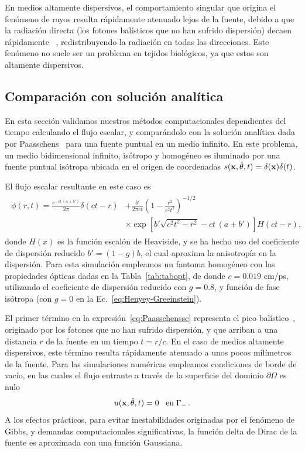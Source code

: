 En medios altamente dispersivos, el comportamiento singular 
que origina el fenómeno de rayos resulta rápidamente atenuado lejos 
de la fuente, debido a que la radiación directa 
(los fotones balísticos que no han sufrido dispersión) decaen rápidamente
~\cite{Ramankutty1997}, redistribuyendo la radiación en todas las 
direcciones. Este fenómeno no suele ser un problema en tejidos biológicos, 
ya que estos son altamente dispersivos.

\subsection{Comparación con solución analítica}

En esta sección validamos nuestros métodos computacionales 
dependientes del tiempo calculando el flujo escalar, 
y comparándolo con la solución analítica dada por Paasschens~\cite{Paasschens1997} 
para una fuente puntual en un medio infinito. 
En este problema, un medio bidimensional infinito, 
isótropo y homogéneo es iluminado por una fuente puntual isótropa
ubicada en el origen de coordenadas $s(\mathbf{x},\hat{\theta},t)=\delta(\mathbf{x})\delta(t)$.

El flujo escalar resultante en este caso es 
\begin{equation}
\begin{split}
\begin{aligned}
\phi(r,t)=\frac{e^{-c t \, (a+b')}}{2\pi}\delta(ct-r)&+\frac{b'}{2\pi c t}\left(1-\frac{r^2}{c^2t^2}\right)^{-1/2}\\
&\times\exp\left[b'\sqrt{c^2t^2-r^2}-c t \, (a+b')\right]H(ct-r),
\end{aligned}
\end{split}
\label{eq:Paasschenssc}
\end{equation}
donde $H(x)$ es la función escalón de Heaviside, 
y se ha hecho uso del coeficiente de dispersión reducido $b'=(1-g)b$, 
el cual aproxima la anisotropía en la dispersión.
Para esta simulación empleamos un fantoma homogéneo con las propiedades ópticas 
dadas en la Tabla~\ref{tab:tabopt}, de donde $c=0.019$ cm/ps, 
utilizando el coeficiente de dispersión reducido con $g=0.8$, y función de fase isótropa (con $g=0$ en la Ec.~\eqref{eq:Henyey-Greeinstein}). 


El primer término en la expresión~\eqref{eq:Paasschenssc} 
representa el pico balístico~\cite{Paasschens1997}, originado 
por los fotones que no han sufrido dispersión, y que arriban a una distancia $r$
 de la fuente en un tiempo $t=r/c$.
En el caso de medios altamente dispersivos, este término resulta rápidamente atenuado 
a unos pocos milímetros de la fuente. Para las simulaciones numéricas 
empleamos condiciones de borde de vacío, en las cuales el flujo 
entrante a través de la superficie del dominio $\partial \Omega$ es nulo 
\begin{equation}
u(\mathbf{x},\hat{\theta},t)=0 \;\;\; \text{en}\; \Gamma_{-} \, .
\label{eq:vacuumbc}
\end{equation}
A los efectos prácticos, para evitar inestabilidades originadas 
por el fenómeno de Gibbs, y demandas computacionales significativas, 
la función delta de Dirac de la fuente es aproximada con una función Gaussiana.

